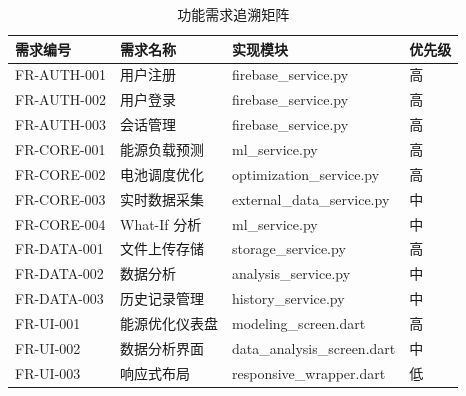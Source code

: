 \begin{table}[htbp]
    \centering
    \caption{功能需求追溯矩阵}
    \label{tab:requirements-traceability}
    \begin{tabularx}{\textwidth}{@{}l l l l@{}}
        \toprule
        \textbf{需求编号} & \textbf{需求名称} & \textbf{实现模块}               & \textbf{优先级} \\
        \midrule
        FR-AUTH-001   & 用户注册          & firebase\_service.py        & 高            \\
        FR-AUTH-002   & 用户登录          & firebase\_service.py        & 高            \\
        FR-AUTH-003   & 会话管理          & firebase\_service.py        & 高            \\
        FR-CORE-001   & 能源负载预测        & ml\_service.py              & 高            \\
        FR-CORE-002   & 电池调度优化        & optimization\_service.py    & 高            \\
        FR-CORE-003   & 实时数据采集        & external\_data\_service.py  & 中            \\
        FR-CORE-004   & What-If 分析    & ml\_service.py              & 中            \\
        FR-DATA-001   & 文件上传存储        & storage\_service.py         & 高            \\
        FR-DATA-002   & 数据分析          & analysis\_service.py        & 中            \\
        FR-DATA-003   & 历史记录管理        & history\_service.py         & 中            \\
        FR-UI-001     & 能源优化仪表盘       & modeling\_screen.dart       & 高            \\
        FR-UI-002     & 数据分析界面        & data\_analysis\_screen.dart & 中            \\
        FR-UI-003     & 响应式布局         & responsive\_wrapper.dart    & 低            \\
        \bottomrule
    \end{tabularx}
\end{table}
